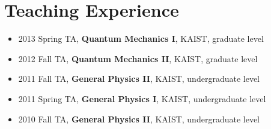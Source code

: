 \hypertarget{teaching-experience}{%
\section{Teaching Experience}\label{teaching-experience}}

\begin{itemize}
\tightlist
\item
  2013 Spring TA, \textbf{Quantum Mechanics I}, KAIST, graduate level
\item
  2012 Fall TA, \textbf{Quantum Mechanics II}, KAIST, graduate level
\item
  2011 Fall TA, \textbf{General Physics II}, KAIST, undergraduate level
\item
  2011 Spring TA, \textbf{General Physics I}, KAIST, undergraduate level
\item
  2010 Fall TA, \textbf{General Physics II}, KAIST, undergraduate level
\end{itemize}
